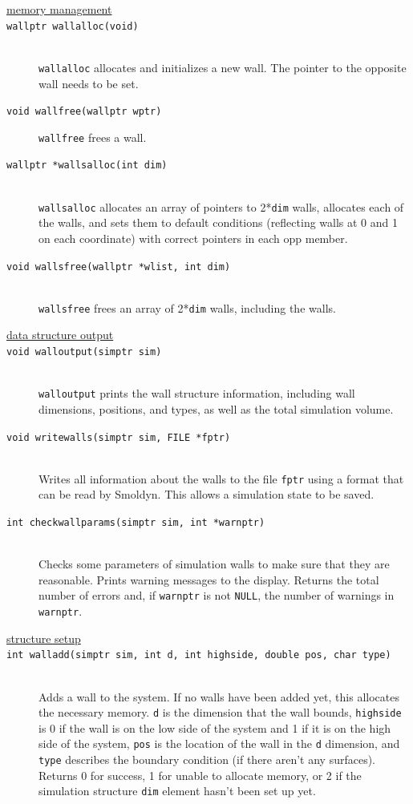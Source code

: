 \documentclass {scrbook}
\newcommand {\ttt} {\texttt}
\begin{document}
\begin{description}
\item[\underline{memory management}]

\item[\ttt{wallptr wallalloc(void)}]
\hfill \\
\ttt{wallalloc} allocates and initializes a new wall. The pointer to the opposite wall needs to be set.

\item[\ttt{void wallfree(wallptr wptr)}]
\ttt{wallfree} frees a wall.

\item[\ttt{wallptr *wallsalloc(int dim)}]
\hfill \\
\ttt{wallsalloc} allocates an array of pointers to 2*\ttt{dim} walls, allocates each of the walls, and sets them to default conditions (reflecting walls at 0 and 1 on each coordinate) with correct pointers in each opp member.

\item[\ttt{void wallsfree(wallptr *wlist, int dim)}]
\hfill \\
\ttt{wallsfree} frees an array of 2*\ttt{dim} walls, including the walls.

\item[\underline{data structure output}]

\item[\ttt{void walloutput(simptr sim)}]
\hfill \\
\ttt{walloutput} prints the wall structure information, including wall dimensions, positions, and types, as well as the total simulation volume.

\item[\ttt{void writewalls(simptr sim, FILE *fptr)}]
\hfill \\
Writes all information about the walls to the file \ttt{fptr} using a format that can be read by Smoldyn. This allows a simulation state to be saved.

\item[\ttt{int checkwallparams(simptr sim, int *warnptr)}]
\hfill \\
Checks some parameters of simulation walls to make sure that they are reasonable. Prints warning messages to the display. Returns the total number of errors and, if \ttt{warnptr} is not \ttt{NULL}, the number of warnings in \ttt{warnptr}.

\item[\underline{structure setup}]

\item[\ttt{int walladd(simptr sim, int d, int highside, double pos, char type)}]
\hfill \\
Adds a wall to the system. If no walls have been added yet, this allocates the necessary memory. \ttt{d} is the dimension that the wall bounds, \ttt{highside} is 0 if the wall is on the low side of the system and 1 if it is on the high side of the system, \ttt{pos} is the location of the wall in the \ttt{d} dimension, and \ttt{type} describes the boundary condition (if there aren't any surfaces). Returns 0 for success, 1 for unable to allocate memory, or 2 if the simulation structure \ttt{dim} element hasn't been set up yet.


\end{description}
\end{document}
